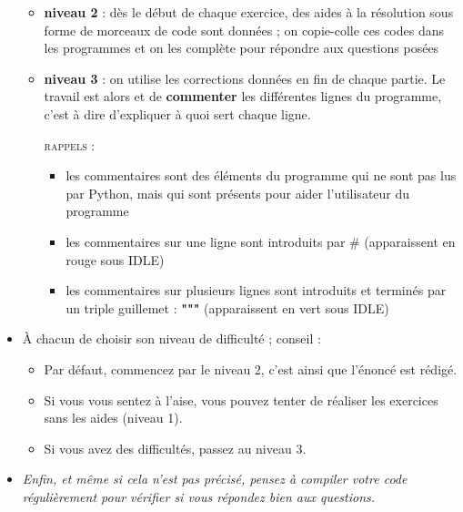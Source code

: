\documentclass[11pt]{article}
\begin{document}
\begin{itemize}
\begin{itemize}
 \medskip
 \item \textbf{niveau 2} : dès le début de chaque exercice, des aides à la résolution sous forme de morceaux de code sont données ; on copie-colle ces codes dans les programmes et on les complète pour répondre aux questions posées
 
 \medskip
 \item \textbf{niveau 3} : on utilise les corrections données en fin de chaque partie. Le travail est alors et de \textbf{commenter} les différentes lignes du programme, c'est à dire d'expliquer à quoi sert chaque ligne.
 
 \medskip
 \textsc{rappels : }
 \begin{itemize}
  \item les commentaires sont des éléments du programme qui ne sont pas lus par Python, mais qui sont présents pour aider l'utilisateur du programme
  
  \medskip
  \item les commentaires sur une ligne sont introduits par \# (apparaissent en rouge sous IDLE)
  
  \medskip
  \item les commentaires sur plusieurs lignes sont introduits et terminés par un triple guillemet : \textbf{"""} (apparaissent en vert sous IDLE)
 \end{itemize}
 
\end{itemize}








\bigskip






\item À chacun de choisir son niveau de difficulté ; conseil : 

\begin{itemize}
 \item Par défaut, commencez par le niveau 2, c'est ainsi que l'énoncé est rédigé. 
 
 \item Si vous vous sentez à l'aise, vous pouvez tenter de réaliser les exercices sans les aides (niveau 1).
 
 \item Si vous avez des difficultés, passez au niveau 3.
\end{itemize}








\bigskip









\item \textit{Enfin, et même si cela n'est pas précisé, pensez à compiler votre code régulièrement pour vérifier si vous répondez bien aux questions.}

\end{itemize}
\end{document}
